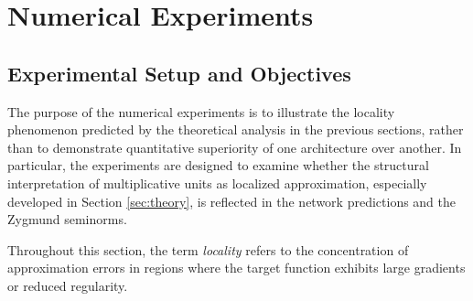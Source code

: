 \documentclass[11pt,reqno]{amsart}
\numberwithin{equation}{section}
\theoremstyle{remark}
\theoremstyle{definition}
\begin{document}





\section{Numerical Experiments}
\label{sec:numeric}

\subsection{Experimental Setup and Objectives}
\label{sec:numeric:setup}

The purpose of the numerical experiments is to illustrate the locality phenomenon predicted by the theoretical analysis in the previous sections, rather than to demonstrate quantitative superiority of one architecture over another.
In particular, the experiments are designed to examine whether the structural interpretation of multiplicative units as localized approximation, especially developed in Section \ref{sec:theory}, is reflected in the network predictions and the Zygmund seminorms. 

Throughout this section, the term {\it{locality}} refers to the concentration of approximation errors in regions where the target function exhibits large gradients or reduced regularity. 
\end{document}
